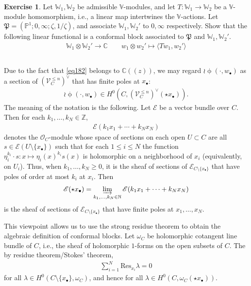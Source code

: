 \documentclass[11pt,b5paper,notitlepage]{article}
\theoremstyle{definition}
\newtheorem{exe}[df]{Exercise}
\theoremstyle{plain}
\newcommand{\fk}{\mathfrak}
\newcommand{\Res}{\mathrm{Res}}
\newcommand{\bk}[1]{\langle {#1}\rangle}
\newcommand{\scr}{\mathscr}
\newcommand{\blt}{\bullet}
\newcommand{\Vbb}{\mathbb V}
\newcommand{\Wbb}{\mathbb W}
\newcommand{\Cbb}{\mathbb C}
\newcommand{\Nbb}{\mathbb N}
\newcommand{\Zbb}{\mathbb Z}
\newcommand{\Pbb}{\mathbb P}
\numberwithin{equation}{section}
\begin{document}
\begin{exe}
Let $\Wbb_1,\Wbb_2$ be admissible $\Vbb$-modules, and let $T:\Wbb_1\rightarrow\Wbb_2$ be a $\Vbb$-module homomorphism, i.e., a linear map intertwines the $\Vbb$-actions. Let $\fk P=(\Pbb^1;0,\infty;\zeta,1/\zeta)$, and associate $\Wbb_1,\Wbb_2'$ to $0,\infty$ respectively. Show that the following linear functional is a conformal block associated to $\fk P$ and $\Wbb_1,\Wbb_2'$.
\begin{gather}
\Wbb_1\otimes\Wbb_2'\rightarrow\Cbb\qquad w_1\otimes w_2'\mapsto \bk{Tw_1,w_2'} 
\end{gather}
\end{exe}










\subsection{}\label{lb193}

Due to the fact that \eqref{eq182} belongs to $\Cbb((z))$, we may regard $\wr\upphi(\cdot,w_\blt)$ as a section of $(\scr V_C^{\leq n})^\vee$ that has finite poles at $x_\blt$:
\begin{align}
\wr\upphi(\cdot,w_\blt)\in H^0(C,(\scr V_C^{\leq n})^\vee(\star x_\blt)).
\end{align}
The meaning of the notation is the following. Let $\scr E$ be a vector bundle over $C$. Then for each $k_1,\dots,k_N\in\Zbb$,
\begin{align*}
\scr E(k_1x_1+\cdots+k_Nx_N)
\end{align*}
denotes the $\scr O_C$-module whose space of sections on each open $U\subset C$ are all $s\in\scr E(U\setminus\{x_\blt\})$ such that for each $1\leq i\leq N$ the function $\eta_i^{k_i}\cdot s:x\mapsto \eta_i(x)^{k_i}s(x)$ is holomorphic on a neighborhood of $x_i$ (equivalently, on $U_i$). Thus, when $k_1,\dots,k_N\geq 0$, it is the sheaf of sections of $\scr E_{C\setminus\{x_\blt\}}$ that have poles of order at most $k_i$ at $x_i$. Then \index{E@$\scr E(\star x_\blt)$}
\begin{align}\label{eq255}
\scr E(\star x_\blt)=\varinjlim_{k_1,\dots,k_N\in\Nbb}\scr E(k_1x_1+\cdots+k_Nx_N)
\end{align} 
is the sheaf of sections of $\scr E_{C\setminus\{x_\blt\}}$ that have finite poles at $x_1,\dots,x_N$.

This viewpoint allows us to use the strong residue theorem to obtain the algebraic definition of conformal blocks. Let $\omega_C$  be holomorphic cotangent line bundle of $C$, i.e., the sheaf of holomorphic $1$-forms on the open subsets of $C$.  The by residue theorem/Stokes' theorem,
\begin{align}
\sum_{i=1}^N \Res_{x_i}\lambda=0
\end{align}
for all $\lambda\in H^0(C\setminus\{x_\blt\},\omega_C)$, and hence for all $\lambda\in H^0(C,\omega_C(\star x_\blt))$.
\end{document}
